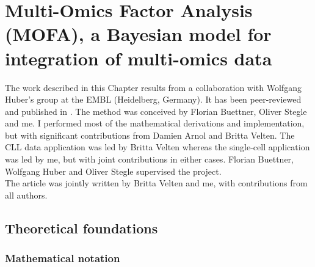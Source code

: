 \graphicspath{{Chapter2/Figs/}}

\chapter{Multi-Omics Factor Analysis (MOFA), a Bayesian model for integration of multi-omics data}

The work described in this Chapter results from a collaboration with Wolfgang Huber's group at the EMBL (Heidelberg, Germany). It has been peer-reviewed and published in \cite{Argelaguet2018}. The method was conceived by Florian Buettner, Oliver Stegle and me. I performed most of the mathematical derivations and implementation, but with significant contributions from Damien Arnol and Britta Velten. The CLL data application was led by Britta Velten whereas the single-cell application was led by me, but with joint contributions in either cases. Florian Buettner, Wolfgang Huber and Oliver Stegle supervised the project.\\
The article was jointly written by Britta Velten and me, with contributions from all authors.

\section{Theoretical foundations}

\subsection*{Mathematical notation} \label{section:mathematical_notation}


